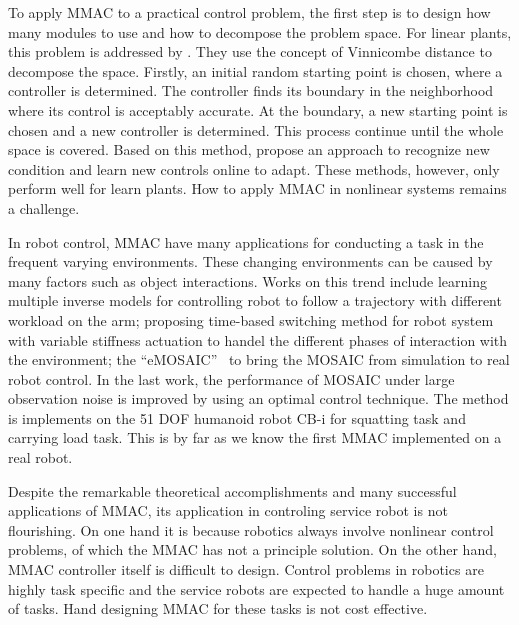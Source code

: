 To apply MMAC to a practical control problem, the first step is to design how many modules to use and how to decompose the problem space. For linear plants, this problem is addressed by \citet{anderson2000multiple}. They use the concept of Vinnicombe distance to decompose the space. Firstly, an initial random starting point is chosen, where a controller is determined. The controller finds its boundary in the neighborhood where its control is acceptably accurate. At the boundary, a new starting point is chosen and a new controller is determined. This process continue until the whole space is covered. Based on this method, \citet{lourenco2006learning} propose an approach to recognize new condition and learn new controls online to adapt. These methods, however, only perform well for learn plants. How to apply MMAC in nonlinear systems remains a challenge.

In robot control, MMAC have many applications for conducting a task in the frequent varying environments. These changing environments can be caused by many factors such as object interactions. Works on this trend include \citet{petkos2006learning} learning multiple inverse models for controlling robot to follow a trajectory with different workload on the arm; \citet{nakanishi2013spatio} proposing time-based switching method for robot system with variable stiffness actuation to handel the different phases of interaction with the environment; the ``eMOSAIC''~\citep{sugimoto2012emosaic} to bring the MOSAIC from simulation to real robot control. In the last work, the performance of MOSAIC under large observation noise is improved by using an optimal control technique. The method is implements on the 51 DOF humanoid robot CB-i for squatting task and carrying load task. This is by far as we know the first MMAC implemented on a real robot.

Despite the remarkable theoretical accomplishments and many successful applications of MMAC, its application in controling service robot is not flourishing. On one hand it is because robotics always involve nonlinear control problems, of which the MMAC has not a principle solution. On the other hand, MMAC controller itself is difficult to design. Control problems in robotics are highly task specific and the service robots are expected to handle a huge amount of tasks. Hand designing MMAC for these tasks is not cost effective. %



